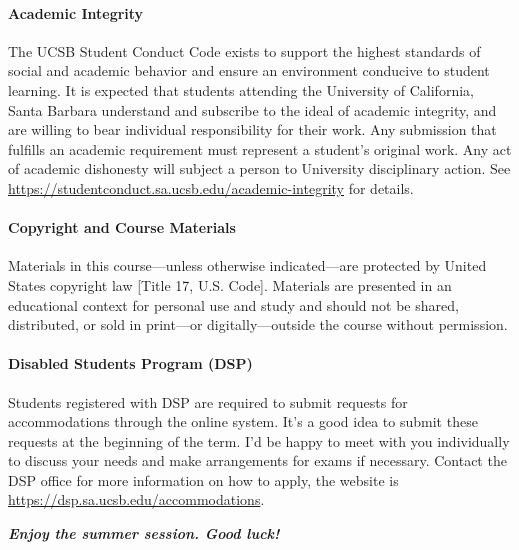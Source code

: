 \documentclass[11pt,letterpaper]{article}
\begin{document}
\paragraph*{Academic Integrity} The UCSB Student Conduct Code exists to support the highest standards of social and academic behavior and ensure an environment conducive to student learning. It is expected that students attending the University of California, Santa Barbara understand and subscribe to the ideal of academic integrity, and are willing to bear individual responsibility for their work. Any submission that fulfills an academic requirement must represent a student’s original work. Any act of academic dishonesty will subject a person to University disciplinary action. See \href{https://studentconduct.sa.ucsb.edu/academic-integrity}{https://studentconduct.sa.ucsb.edu/academic-integrity} for details. 

\paragraph*{Copyright and Course Materials} Materials in this course—unless otherwise indicated—are protected by United States copyright law [Title 17, U.S. Code].  Materials are presented in an educational context for personal use and study and should not be shared, distributed, or sold in print—or digitally—outside the course without permission. 

\paragraph*{Disabled Students Program (DSP)} Students registered with DSP are required to submit requests for accommodations through the online system. It's a good idea to submit these requests at the beginning of the term. I'd be happy to meet with you individually to discuss your needs and make arrangements for exams if necessary. Contact the DSP office for more information on how to apply, the website is \href{https://dsp.sa.ucsb.edu/accommodations}{https://dsp.sa.ucsb.edu/accommodations}.

\vspace*{0.2in}

\noindent
\textbf{\emph{Enjoy the summer session.  Good luck!}}
\end{document}
